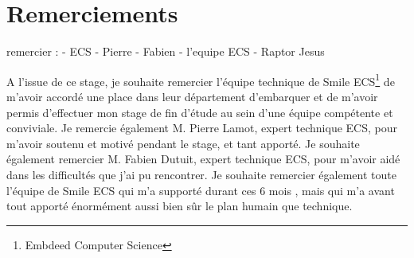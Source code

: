 \section{Remerciements}
remercier :
  - ECS
  - Pierre
  - Fabien
  - l'equipe ECS
  - Raptor Jesus


  A l’issue de ce stage, je souhaite remercier l'équipe technique de Smile ECS\footnote{Embdeed Computer Science}
  de m’avoir accordé une place dans leur département d'embarquer et de m’avoir permis d’effectuer mon
  stage de fin d’étude au sein d’une équipe compétente et conviviale.
  Je remercie également M. Pierre Lamot, expert technique ECS, pour m’avoir
  soutenu et motivé pendant le stage, et tant apporté.
  Je souhaite également remercier M. Fabien Dutuit, expert technique ECS, pour m’avoir
  aidé dans les difficultés que j’ai pu rencontrer.
  Je souhaite remercier également toute l’équipe de Smile ECS qui m’a supporté durant ces 6 mois
  , mais qui m’a avant tout apporté énormément aussi bien sûr le plan humain que technique.
